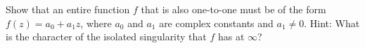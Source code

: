 Show that an entire function $f$ that is also one-to-one must be of
the form $f(z)=a_0+a_1z$, where $a_0$ and $a_1$ are complex constants
and $a_1\neq 0$. Hint: What is the character of the isolated
singularity that $f$ has at $\infty$?

